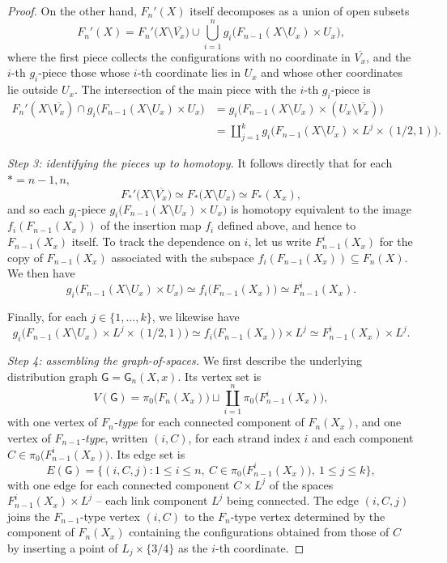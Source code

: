 \documentclass[reqno]{amsart}
\theoremstyle{definition}
\newcommand\sfG{\mathsf{G}}
\numberwithin{equation}{section}
\begin{document}
\begin{proof}
On the other hand, \(F_n'(X)\) itself decomposes as a union of
open subsets
\[
F_n'(X)
=
F_n'\bigl(X\setminus \overline{V_x}\bigr)
\cup
\bigcup_{i=1}^n
g_i\bigl(F_{n-1}(X\setminus U_x)\times U_x\bigr),
\]
where the first piece collects the configurations with no
coordinate in \(\overline{V_x}\), and the \(i\)-th \(g_i\)-piece those
whose \(i\)-th coordinate lies in \(U_x\) and whose other coordinates
lie outside \(U_x\). The intersection of the main piece with the
\(i\)-th \(g_i\)-piece is
\begin{align*}
F_n'(X\setminus \overline{V_x})
\cap
g_i\bigl(F_{n-1}(X\setminus U_x)\times U_x\bigr)
&=
g_i\bigl(F_{n-1}(X\setminus U_x)\times (U_x\setminus \overline{V_x})\bigr)\\
&=
\coprod_{j=1}^k g_i\bigl(F_{n-1}(X\setminus U_x)\times L^j\times(1/2,1)\bigr).
\end{align*}

\smallskip
\noindent\emph{Step 3: identifying the pieces up to homotopy.}
It follows directly
that for each \(*=n-1, n\),
\[
F_*'\bigl(X\setminus \overline{V_x}\bigr)
\simeq
F_*\bigl(X\setminus U_x\bigr)
\simeq
F_*(X_x),
\]
and so 
each \(g_i\)-piece \(g_i\bigl(F_{n-1}(X\setminus U_x)\times U_x\bigr)\) is homotopy
equivalent to the image \(f_i(F_{n-1}(X_x))\) of the insertion map
\(f_i\) defined above, and hence to \(F_{n-1}(X_x)\) itself. 
To track the dependence on \(i\), let us
write \(F_{n-1}^i(X_x)\) for the copy of \(F_{n-1}(X_x)\) associated
with the subspace \(f_i(F_{n-1}(X_x))\subseteq F_n(X)\). We then have
\[
g_i\bigl(F_{n-1}(X\setminus U_x)\times U_x\bigr)
\simeq
f_i\bigl(F_{n-1}(X_x)\bigr)
\simeq
F_{n-1}^i(X_x).
\]

Finally, for each \(j\in\{1,\dots,k\}\), we likewise have
\[
g_i\bigl(F_{n-1}(X\setminus U_x)\times L^j\times(1/2,1)\bigr)
\simeq
f_i\bigl(F_{n-1}(X_x)\bigr)\times L^j
\simeq
F_{n-1}^i(X_x)\times L^j.
\]

\smallskip
\noindent\emph{Step 4: assembling the graph-of-spaces.}
We first describe the underlying distribution graph
\(\sfG=\sfG_n(X,x)\). Its vertex set is
\[
V(\sfG) = \pi_0\bigl(F_n(X_x)\bigr)\sqcup
\coprod_{i=1}^{n}\pi_0\bigl(F^i_{n-1}(X_x)\bigr),
\]
with one vertex of \emph{\(F_n\)-type} for each connected
component of \(F_n(X_x)\), and one vertex of
\emph{\(F_{n-1}\)-type}, written \((i,C)\), for each strand
index \(i\) and each component
\(C\in\pi_0\bigl(F^i_{n-1}(X_x)\bigr)\). Its edge set is
\[
E(\sfG) = \bigl\{(i,C,j) :
1\le i\le n,\ C\in\pi_0\bigl(F^i_{n-1}(X_x)\bigr),\
1\le j\le k\bigr\},
\]
with one edge for each connected component \(C\times L^j\) of
the spaces \(F^i_{n-1}(X_x)\times L^j\) -- each link component
\(L^j\) being connected. The edge \((i,C,j)\) joins the
\(F_{n-1}\)-type vertex \((i,C)\) to the \(F_n\)-type vertex
determined by the component of \(F_n(X_x)\) containing the
configurations obtained from those of \(C\) by inserting a
point of \(L_j\times\{3/4\}\) as the \(i\)-th coordinate.


\end{proof}
\end{document}
